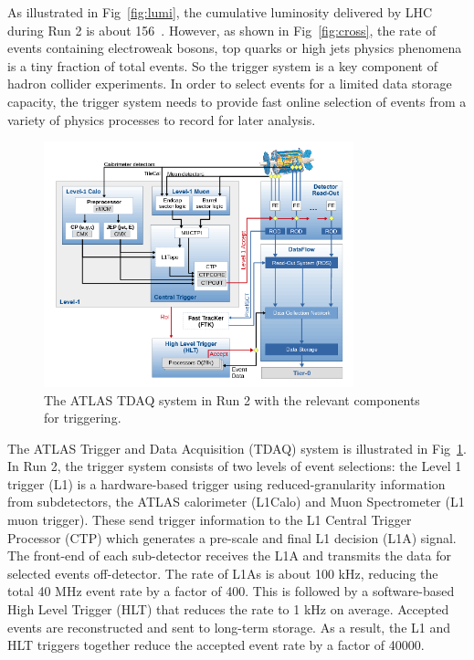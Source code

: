 \par As illustrated in Fig~\ref{fig:lumi}, the cumulative luminosity delivered by LHC during Run 2 is about 156~\ifb. However, as shown in Fig~\ref{fig:cross}, the rate of events containing electroweak bosons, top quarks or high \pt jets physics phenomena is a tiny fraction of total events. So the trigger system is a key component of hadron collider experiments. In order to select events for a limited data storage capacity, the trigger system needs to provide fast online selection of events from a variety of physics processes to record for later analysis.

\begin{figure}[htbp!]
    \centering
    \includegraphics[width=0.8\textwidth]{chapters/c4/figures/TDAQ}
    \caption{The ATLAS TDAQ system in Run 2 with the relevant components for triggering.}
    \label{fig:TDAQ}
\end{figure}

\par The ATLAS Trigger and Data Acquisition (TDAQ) system \cite{Ruiz-Martinez:2133909} is illustrated in Fig~\ref{fig:TDAQ}. In Run 2, the trigger system consists of two levels of event selections: the Level 1 trigger (L1) is a hardware-based trigger using reduced-granularity information from subdetectors, the ATLAS calorimeter (L1Calo) and Muon Spectrometer (L1 muon trigger). These send trigger information to the L1 Central Trigger Processor (CTP) which generates a pre-scale and final L1 decision (L1A) signal. The front-end of each sub-detector receives the L1A and transmits the data for selected events off-detector. The rate of L1As is about 100 kHz, reducing the total 40 MHz event rate by a factor of 400. This is followed by a software-based High Level Trigger (HLT) that reduces the rate to 1 kHz on average. Accepted events are reconstructed and sent to long-term storage. As a result, the L1 and HLT triggers together reduce the accepted event rate by a factor of 40000.
